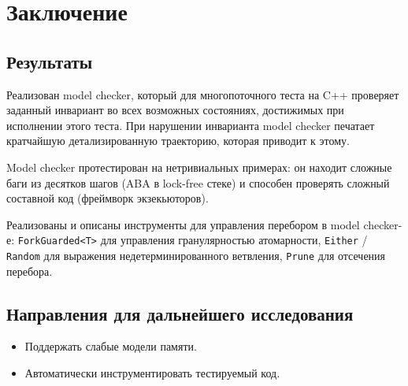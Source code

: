 \chapter{Заключение}



\section{Результаты}

Реализован model checker, который для многопоточного теста на C++ проверяет заданный инвариант во всех возможных состояниях, достижимых при исполнении этого теста. При нарушении инварианта model checker печатает кратчайшую детализированную траекторию, которая приводит к этому.

Model checker протестирован на нетривиальных примерах: он находит сложные баги из десятков шагов (ABA в lock-free стеке) и способен проверять сложный составной код (фреймворк экзекьюторов). 

Реализованы и описаны инструменты  для управления перебором в model checker-е: \texttt{ForkGuarded<T>} для управления гранулярностью атомарности, \texttt{Either} / \texttt{Random} для выражения недетерминированного ветвления, \texttt{Prune} для отсечения перебора. 

\section{Направления для дальнейшего исследования}

\begin{itemize}

\item	Поддержать слабые модели памяти.

\item	Автоматически инструментировать тестируемый код.

\end{itemize}

